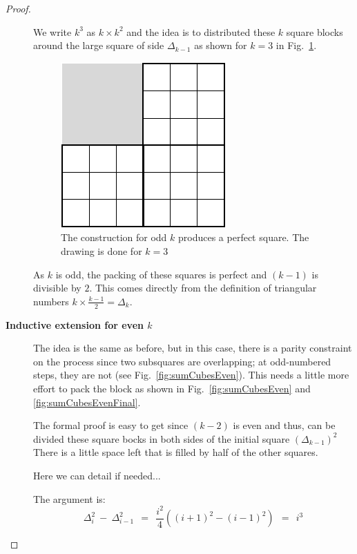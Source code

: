\begin{proof}
\begin{description}
We write $k^3$ as $k \times k^2$ and the idea is to distributed these $k$ square blocks
around the large square of side $\Delta_{k-1}$ as shown for $k=3$ in Fig.~\ref{fig:sumCubes3}. 
\begin{figure}[ht]
\begin{center}
       \includegraphics[scale=0.4]{FiguresMaths/SumCubes3}
\caption{The construction for odd $k$ produces a perfect square. The drawing is done for $k=3$}
       \label{fig:sumCubes3}
\end{center}
\end{figure}
As $k$ is odd, the packing of these squares is perfect and $(k-1)$ is divisible by $2$. 
This comes directly from the definition of triangular numbers $k \times \frac{k-1}{2} = \Delta_k$.


\item[{\bf Inductive extension for even $k$}]

The idea is the same as before, but in this case, 
there is a parity constraint on the process since
two subsquares are overlapping; at odd-numbered steps, they are not
(see Fig.~\ref{fig:sumCubesEven}).
This needs a little more effort to pack the block as shown in Fig.~\ref{fig:sumCubesEven}
and \ref{fig:sumCubesEvenFinal}.

The formal proof is easy to get since $(k-2)$ is even 
and thus, can be divided these square bocks in both sides of the initial square $(\Delta_{k-1})^2$
There is a little space left that is filled by half of the other squares.

{\Denis Here we can detail if needed...

The argument is:
\[
\Delta_i^2 \ - \ \Delta_{i-1}^2 
 \ \ =  \ \ \frac{i^2}{4} \left( (i+1)^2 - (i-1)^2 \right)
 \ \ = \ \ i^3
\]
}


\end{description}
\end{proof}

